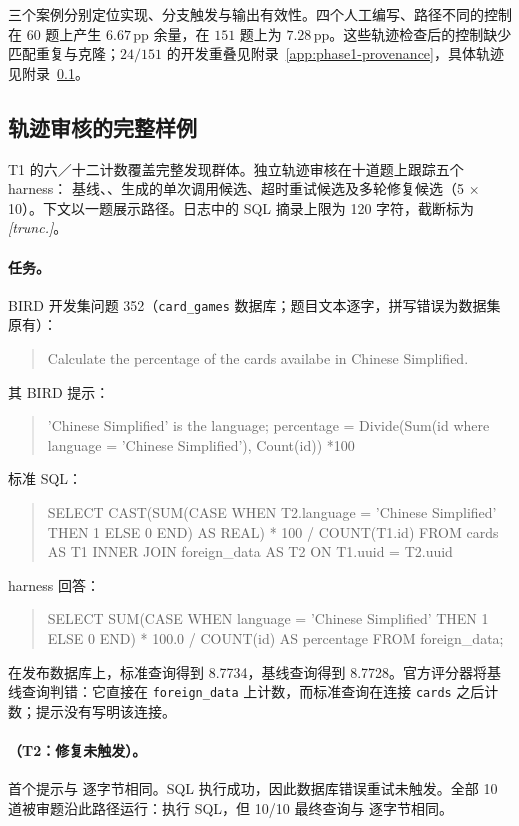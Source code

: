 三个案例分别定位实现、分支触发与输出有效性。四个人工编写、路径不同的控制在 $60$ 题上产生 $6.67$\,pp 余量，在 $151$ 题上为 $7.28$\,pp。这些轨迹检查后的控制缺少匹配重复与克隆；$24/151$ 的开发重叠见附录~\ref{app:phase1-provenance}，具体轨迹见附录~\ref{app:examples}。

\FloatBarrier
\subsection{轨迹审核的完整样例}\label{app:examples}

T1 的六／十二计数覆盖完整发现群体。独立轨迹审核在十道题上跟踪五个 harness：\bare{} 基线、\react{}、生成的单次调用候选、超时重试候选及多轮修复候选（5 $\times$ 10）。下文以一题展示路径。日志中的 SQL 摘录上限为 120 字符，截断标为 \emph{[trunc.]}。

\paragraph{任务。}BIRD 开发集问题 352（\texttt{card\_games} 数据库；题目文本逐字，拼写错误为数据集原有）：
\begin{quote}\small\ttfamily
Calculate the percentage of the cards availabe in Chinese Simplified.
\end{quote}
其 BIRD 提示：
\begin{quote}\small\ttfamily
'Chinese Simplified' is the language; percentage = Divide(Sum(id where
language = 'Chinese Simplified'), Count(id)) *100
\end{quote}
标准 SQL：
\begin{quote}\small\ttfamily
SELECT CAST(SUM(CASE WHEN T2.language = 'Chinese Simplified' THEN 1 ELSE 0
END) AS REAL) * 100 / COUNT(T1.id) FROM cards AS T1 INNER JOIN foreign\_data
AS T2 ON T1.uuid = T2.uuid
\end{quote}
\bare{} harness 回答：
\begin{quote}\small\ttfamily
SELECT SUM(CASE WHEN language = 'Chinese Simplified' THEN 1 ELSE 0 END) *
100.0 / COUNT(id) AS percentage FROM foreign\_data;
\end{quote}
在发布数据库上，标准查询得到 8.7734，基线查询得到 8.7728。官方评分器将基线查询判错：它直接在 \texttt{foreign\_data} 上计数，而标准查询在连接 \texttt{cards} 之后计数；提示没有写明该连接。

\paragraph{\react{}（T2：修复未触发）。}
首个提示与 \bare{} 逐字节相同。SQL 执行成功，因此数据库错误重试未触发。全部 10 道被审题沿此路径运行：执行 SQL，但 10/10 最终查询与 \bare{} 逐字节相同。

